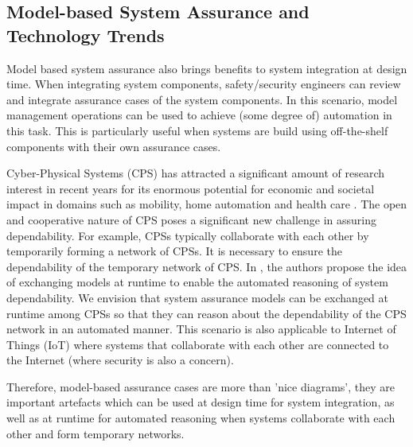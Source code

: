 \subsection{Model-based System Assurance and Technology Trends}
Model based system assurance also brings benefits to system integration at design time. When integrating system components, safety/security engineers can review and integrate assurance cases of the system components. In this scenario, model management operations can be used to achieve (some degree of) automation in this task. This is particularly useful when systems are build using off-the-shelf components with their own assurance cases.

Cyber-Physical Systems (CPS) has attracted a significant amount of research interest in recent years for its enormous potential for economic and societal impact in domains such as mobility, home automation and health care \cite{wei2017deis}. 
The open and cooperative nature of CPS poses a significant new challenge in assuring dependability. 
For example, CPSs typically collaborate with each other by temporarily forming a network of CPSs. 
It is necessary to ensure the dependability of the temporary network of CPS.
In \cite{Schneider2015}, the authors propose the idea of exchanging models at runtime to enable the automated reasoning of system dependability. 
We envision that system assurance models can be exchanged at runtime among CPSs so that they can reason about the dependability of the CPS network in an automated manner. 
This scenario is also applicable to Internet of Things (IoT) where systems that collaborate with each other are connected to the Internet (where security is also a concern). 

Therefore, model-based assurance cases are more than 'nice diagrams', they are important artefacts which can be used at design time for system integration, as well as at runtime for automated reasoning when systems collaborate with each other and form temporary networks. 